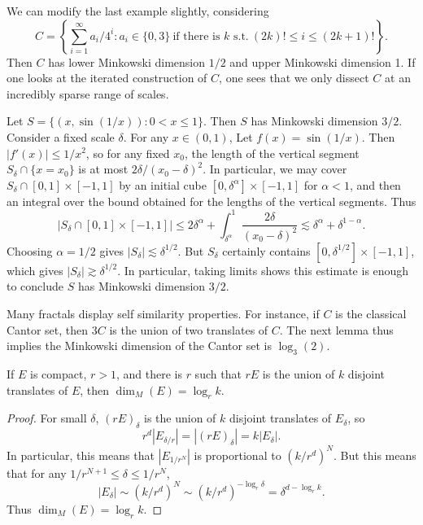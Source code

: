 \begin{example}
	We can modify the last example slightly, considering
	\[ C = \left\{ \sum_{i = 1}^\infty a_i/4^i : a_i \in \{ 0, 3 \}\ \text{if there is $k$ s.t.}\ (2k)! \leq i \leq (2k+1)! \right\}. \]
	Then $C$ has lower Minkowski dimension $1/2$ and upper Minkowski dimension 1. If one looks at the iterated construction of $C$, one sees that we only dissect $C$ at an incredibly sparse range of scales.
\end{example}

\begin{example}
	Let $S = \{ (x,\sin(1/x)) : 0 < x \leq 1 \}$. Then $S$ has Minkowski dimension $3/2$. Consider a fixed scale $\delta$. For any $x \in (0,1)$, Let $f(x) = \sin(1/x)$. Then $|f'(x)| \leq 1/x^2$, so for any fixed $x_0$, the length of the vertical segment $S_\delta \cap \{ x = x_0 \}$ is at most $2\delta / (x_0 - \delta)^2$. In particular, we may cover $S_\delta \cap [0,1] \times [-1,1]$ by an initial cube $[0, \delta^\alpha] \times [-1,1]$ for $\alpha < 1$, and then an integral over the bound obtained for the lengths of the vertical segments. Thus
	\[ |S_\delta \cap [0,1] \times [-1,1]| \leq 2\delta^\alpha + \int_{\delta^\alpha}^1 \frac{2\delta}{(x_0 - \delta)^2} \lesssim \delta^\alpha + \delta^{1-\alpha}. \]
	Choosing $\alpha = 1/2$ gives $|S_\delta| \lesssim \delta^{1/2}$. But $S_\delta$ certainly contains $[0,\delta^{1/2}] \times [-1,1]$, which gives $|S_\delta| \gtrsim \delta^{1/2}$. In particular, taking limits shows this estimate is enough to conclude $S$ has Minkowski dimension $3/2$.
\end{example}

Many fractals display self similarity properties. For instance, if $C$ is the classical Cantor set, then $3C$ is the union of two translates of $C$. The next lemma thus implies the Minkowski dimension of the Cantor set is $\log_3(2)$.

\begin{theorem}
	If $E$ is compact, $r > 1$, and there is $r$ such that $rE$ is the union of $k$ disjoint translates of $E$, then $\dim_M(E) = \log_r k$.
\end{theorem}
\begin{proof}
	For small $\delta$, $(rE)_\delta$ is the union of $k$ disjoint translates of $E_\delta$, so
	\[ r^d |E_{\delta/r}| = |(rE)_\delta| = k |E_\delta|. \]
	In particular, this means that $|E_{1/r^N}|$ is proportional to $(k/r^d)^N$. But this means that for any $1/r^{N+1} \leq \delta \leq 1/r^N$,
	\[ |E_\delta| \sim (k/r^d)^N \sim (k/r^d)^{-\log_r \delta} = \delta^{d - \log_r k}. \]
	Thus $\dim_M(E) = \log_r k$.
\end{proof}

